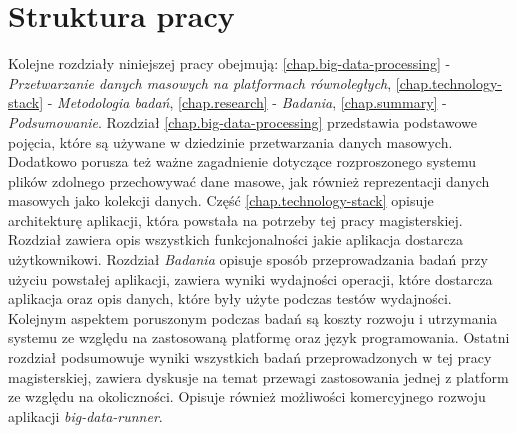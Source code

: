 \section{Struktura pracy}
Kolejne rozdziały niniejszej pracy obejmują: \ref{chap.big-data-processing} - \textit{Przetwarzanie danych masowych na platformach równoległych}, \ref{chap.technology-stack} - \textit{Metodologia badań}, \ref{chap.research} - \textit{Badania}, \ref{chap.summary} - \textit{Podsumowanie}. Rozdział \ref{chap.big-data-processing} przedstawia podstawowe pojęcia, które są używane w dziedzinie przetwarzania danych masowych. Dodatkowo porusza też ważne zagadnienie dotyczące rozproszonego systemu plików zdolnego przechowywać dane masowe, jak również reprezentacji danych masowych jako kolekcji danych. Część \ref{chap.technology-stack} opisuje architekturę aplikacji, która powstała na potrzeby tej pracy magisterskiej. Rozdział zawiera opis wszystkich funkcjonalności jakie aplikacja dostarcza użytkownikowi. Rozdział \textit{Badania} opisuje sposób przeprowadzania badań przy użyciu powstałej aplikacji, zawiera wyniki wydajności operacji, które dostarcza aplikacja oraz opis danych, które były użyte podczas testów wydajności. Kolejnym aspektem poruszonym podczas badań są koszty rozwoju i utrzymania systemu ze względu na zastosowaną platformę oraz język programowania. Ostatni rozdział podsumowuje wyniki wszystkich badań przeprowadzonych w tej pracy magisterskiej, zawiera dyskusje na temat przewagi zastosowania jednej z platform ze względu na okoliczności. Opisuje również możliwości komercyjnego rozwoju aplikacji \textit{big-data-runner}.
